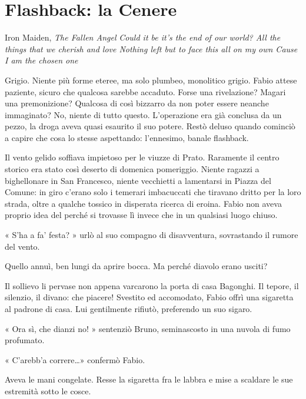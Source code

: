 \chapter{Flashback: la Cenere}

\begin{chapquote}{Iron Maiden, \textit{The Fallen Angel}}
	\textit{Could it be it's the end of our world?\newline
		All the things that we cherish and love\newline
		Nothing left but to face this all on my own\newline
		Cause I am the chosen one
	}
\end{chapquote}


Grigio. Niente più forme eteree, ma solo plumbeo, monolitico grigio. Fabio attese paziente, sicuro che qualcosa sarebbe accaduto. Forse una rivelazione? Magari una premonizione? Qualcosa di così bizzarro da non poter essere neanche immaginato? No, niente di tutto questo. L'operazione era già conclusa da un pezzo, la droga aveva quasi esaurito il suo potere. Restò deluso quando cominciò a capire che cosa lo stesse aspettando: l'ennesimo, banale flashback.

Il vento gelido soffiava impietoso per le viuzze di Prato. Raramente il centro storico era stato così deserto di domenica pomeriggio. Niente ragazzi a bighellonare in San Francesco, niente vecchietti a lamentarsi in Piazza del Comune: in giro c'erano solo i temerari imbacuccati che tiravano dritto per la loro strada, oltre a qualche tossico in disperata ricerca di eroina. Fabio non aveva proprio idea del perché si trovasse lì invece che in un qualsiasi luogo chiuso.

« S'ha a fa' festa? » urlò al suo compagno di disavventura, sovrastando il rumore del vento.

Quello annuì, ben lungi da aprire bocca. Ma perché diavolo erano usciti?

Il sollievo li pervase non appena varcarono la porta di casa Bagonghi. Il tepore, il silenzio, il divano: che piacere! Svestito ed accomodato, Fabio offrì una sigaretta al padrone di casa. Lui gentilmente rifiutò, preferendo un suo sigaro.

« Ora sì, che dianzi no! » sentenziò Bruno, seminascosto in una nuvola di fumo profumato.

« C'arebb'a correre\ldots» confermò Fabio.

Aveva le mani congelate. Resse la sigaretta fra le labbra e mise a scaldare le sue estremità sotto le cosce.

